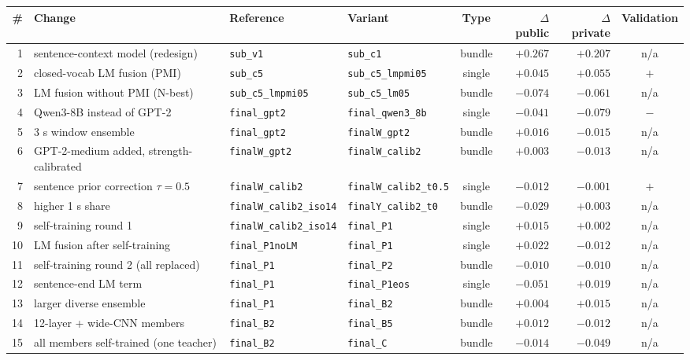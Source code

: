 \begin{tabular}{rlllcrrc}
\toprule
\# & Change & Reference & Variant & Type & $\Delta$ public & $\Delta$ private & Validation \\
\midrule
    1 & sentence-context model (redesign) & \texttt{sub\_v1} & \texttt{sub\_c1} & bundle & $+0.267$ & $+0.207$ & n/a \\
    2 & closed-vocab LM fusion (PMI) & \texttt{sub\_c5} & \texttt{sub\_c5\_lmpmi05} & single & $+0.045$ & $+0.055$ & $+$ \\
    3 & LM fusion without PMI (N-best) & \texttt{sub\_c5\_lmpmi05} & \texttt{sub\_c5\_lm05} & bundle & $-0.074$ & $-0.061$ & n/a \\
    4 & Qwen3-8B instead of GPT-2 & \texttt{final\_gpt2} & \texttt{final\_qwen3\_8b} & single & $-0.041$ & $-0.079$ & $-$ \\
    5 & 3 s window ensemble & \texttt{final\_gpt2} & \texttt{finalW\_gpt2} & bundle & $+0.016$ & $-0.015$ & n/a \\
    6 & GPT-2-medium added, strength-calibrated & \texttt{finalW\_gpt2} & \texttt{finalW\_calib2} & bundle & $+0.003$ & $-0.013$ & n/a \\
    7 & sentence prior correction $\tau{=}0.5$ & \texttt{finalW\_calib2} & \texttt{finalW\_calib2\_t0.5} & single & $-0.012$ & $-0.001$ & $+$ \\
    8 & higher 1 s share & \texttt{finalW\_calib2\_iso14} & \texttt{finalY\_calib2\_t0} & bundle & $-0.029$ & $+0.003$ & n/a \\
    9 & self-training round 1 & \texttt{finalW\_calib2\_iso14} & \texttt{final\_P1} & single & $+0.015$ & $+0.002$ & n/a \\
    10 & LM fusion after self-training & \texttt{final\_P1noLM} & \texttt{final\_P1} & single & $+0.022$ & $-0.012$ & n/a \\
    11 & self-training round 2 (all replaced) & \texttt{final\_P1} & \texttt{final\_P2} & bundle & $-0.010$ & $-0.010$ & n/a \\
    12 & sentence-end LM term & \texttt{final\_P1} & \texttt{final\_P1eos} & single & $-0.051$ & $+0.019$ & n/a \\
    13 & larger diverse ensemble & \texttt{final\_P1} & \texttt{final\_B2} & bundle & $+0.004$ & $+0.015$ & n/a \\
    14 & 12-layer + wide-CNN members & \texttt{final\_B2} & \texttt{final\_B5} & bundle & $+0.012$ & $-0.012$ & n/a \\
    15 & all members self-trained (one teacher) & \texttt{final\_B2} & \texttt{final\_C} & bundle & $-0.014$ & $-0.049$ & n/a \\

\end{tabular}
